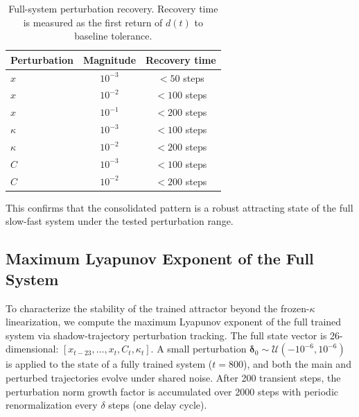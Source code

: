 \documentclass[12pt,a4paper]{article}
\begin{document}
\begin{table}[h]

\centering

\caption{Full-system perturbation recovery. Recovery time is measured as the first return of $d(t)$ to baseline tolerance.}

\label{tab:perturb_recovery}

\begin{tabular}{lcc}

\toprule

Perturbation & Magnitude & Recovery time \\

\midrule

$x$ & $10^{-3}$ & $<50$ steps \\

$x$ & $10^{-2}$ & $<100$ steps \\

$x$ & $10^{-1}$ & $<200$ steps \\

$\kappa$ & $10^{-3}$ & $<100$ steps \\

$\kappa$ & $10^{-2}$ & $<200$ steps \\

$C$ & $10^{-3}$ & $<100$ steps \\

$C$ & $10^{-2}$ & $<200$ steps \\

\bottomrule

\end{tabular}

\end{table}



This confirms that the consolidated pattern is a robust attracting state of the full slow-fast system under the tested perturbation range.



\subsection{Maximum Lyapunov Exponent of the Full System}

\label{sec:lyapunov}



To characterize the stability of the trained attractor beyond the frozen-$\kappa$ linearization, we compute the maximum Lyapunov exponent of the full trained system via shadow-trajectory perturbation tracking. The full state vector is 26-dimensional: $[x_{t-23}, \ldots, x_t, C_t, \kappa_t]$. A small perturbation $\bm{\delta}_0 \sim \mathcal{U}(-10^{-6}, 10^{-6})$ is applied to the state of a fully trained system ($t=800$), and both the main and perturbed trajectories evolve under shared noise. After 200 transient steps, the perturbation norm growth factor is accumulated over 2000 steps with periodic renormalization every $\delta$ steps (one delay cycle).
\end{document}
